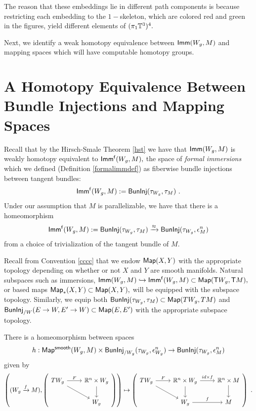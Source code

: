 The reason that these embeddings lie in different path components is because restricting each embedding to the $1-$skeleton, which are colored red and green in the figures, yield different elements of $(\pi_{1}\mathbb T^{3})^{4}.$



Next, we identify a weak homotopy equivalence between ${\sf Imm}(W_{g}, M)$ and mapping spaces which will have computable homotopy groups.


\section{A Homotopy Equivalence Between Bundle Injections and Mapping Spaces} 
Recall that by the Hirsch-Smale Theorem \ref{hst} we have that ${\sf Imm}(W_{g}, M)$ is weakly homotopy equivalent to ${\sf Imm^{f}}(W_{g}, M),$ the space of \textit{formal immersions} which we defined (Definition \ref{formalimmdef}) as fiberwise bundle injections between tangent bundles: 
\[
{\sf Imm^{f}}(W_{g}, M) := {\sf BunInj}(\tau_{W_{g}}, \tau_{M})~.
\]
Under our assumption that $M$ is parallelizable, we have that there is a homeomorphism 
\begin{equation} \label{eq1new}
{\sf Imm^{f}}(W_{g}, M) := {\sf BunInj}(\tau_{W_{g}}, \tau_{M}) \xrightarrow{\approx} {\sf BunInj}(\tau_{W_{g}}, \epsilon_{M}^{n})
\end{equation}
from a choice of trivialization of the tangent bundle of $M.$


\begin{convention} \label{cov1}
Recall from Convention \ref{cccc} that we endow ${\sf Map}(X, Y)$ with the appropriate topology depending on whether or not $X$ and $Y$ are smooth manifolds. Natural subspaces such as immersions, ${\sf Imm}(W_{g}, M) \hookrightarrow {\sf Imm^{f}}(W_{g}, M) \subset {\sf Map}(\mathsf T W_{g}, \mathsf T M),$ or based maps ${\sf Map}_{\ast}(X, Y) \subset {\sf Map}(X, Y),$ will be equipped with the subspace topology. Similarly, we equip both ${\sf BunInj}(\tau_{W_{g}}, \tau_{M}) \subset {\sf Map}(TW_{g}, TM)$ and ${\sf BunInj}_{/W}(E \rightarrow W, E' \rightarrow W) \subset {\sf Map}(E, E')$ with the appropriate subspace topology.
\end{convention}




\begin{lemma} \label{lem.homeo}
There is a homeomorphism between spaces 
\[
h: {\sf Map^{smooth}}(W_{g}, M) \times {\sf BunInj}_{/W_{g}}(\tau_{W_{g}}, \epsilon_{W_{g}}^{n}) \rightarrow {\sf BunInj}(\tau_{W_{g}}, \epsilon_{M}^{n})
\]
given by 
\[\left( (W_{g} \xra{f} M), \left(\begin{tikzcd}
TW_{g} \arrow[rd] \arrow[r, "F"]  & \RR^{n} \times W_{g} \arrow[d]\\
& W_{g}
\end{tikzcd} \right) \right)
\mapsto \left(
\begin{tikzcd}
TW_{g} \arrow[rd] \arrow[r, "F"] & \RR^{n} \times W_{g} \arrow[d]  \arrow[r, "id \times f"]& \RR^{n} \times M \arrow[d] \\
& W_{g} \arrow[r, "f"] & M
\end{tikzcd} \right)~.
\]
\end{lemma}

